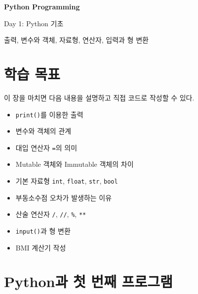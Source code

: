\documentclass[11pt,a4paper]{article}
\begin{document}
\begin{titlepage}
    \centering
    \vspace*{3cm}

    {\Huge\bfseries Python Programming\par}
    \vspace{0.8cm}
    {\LARGE Day 1: Python 기초\par}

    \vspace{2cm}

    {\large 출력, 변수와 객체, 자료형, 연산자, 입력과 형 변환\par}

    \vfill
\end{titlepage}

\tableofcontents
\newpage

\section{학습 목표}

\begin{learningbox}
이 장을 마치면 다음 내용을 설명하고 직접 코드로 작성할 수 있다.
\begin{itemize}[leftmargin=1.5em]
    \item \texttt{print()}를 이용한 출력
    \item 변수와 객체의 관계
    \item 대입 연산자 \texttt{=}의 의미
    \item Mutable 객체와 Immutable 객체의 차이
    \item 기본 자료형 \texttt{int}, \texttt{float}, \texttt{str}, \texttt{bool}
    \item 부동소수점 오차가 발생하는 이유
    \item 산술 연산자 \texttt{/}, \texttt{//}, \texttt{\%}, \texttt{**}
    \item \texttt{input()}과 형 변환
    \item BMI 계산기 작성
\end{itemize}
\end{learningbox}

\section{Python과 첫 번째 프로그램}
\end{document}
